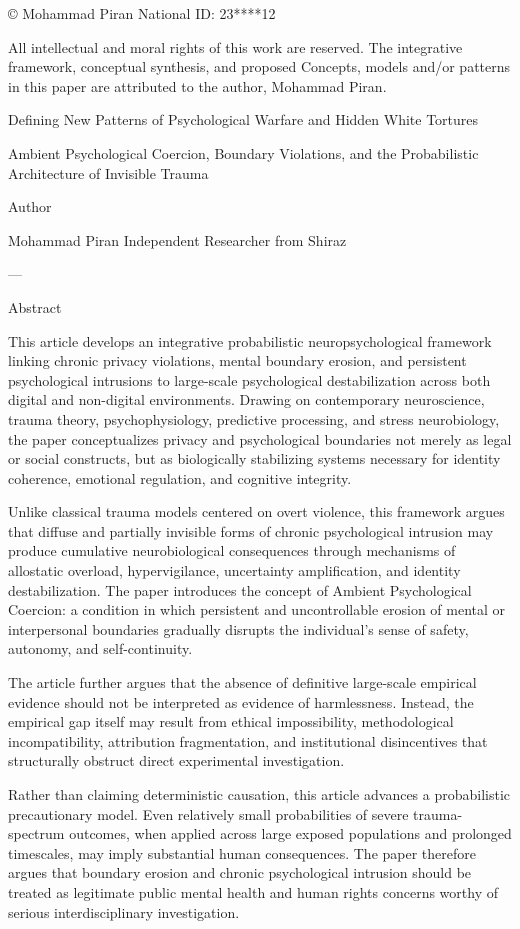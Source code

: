 © Mohammad Piran
National ID: 23****12

All intellectual and moral rights of this work are reserved. The integrative framework, conceptual synthesis, and proposed Concepts, models and/or patterns in this paper are attributed to the author, Mohammad Piran.

Defining New Patterns of Psychological Warfare and Hidden White Tortures

Ambient Psychological Coercion, Boundary Violations, and the Probabilistic Architecture of Invisible Trauma

Author

Mohammad Piran
Independent Researcher from Shiraz


---

Abstract

This article develops an integrative probabilistic neuropsychological framework linking chronic privacy violations, mental boundary erosion, and persistent psychological intrusions to large-scale psychological destabilization across both digital and non-digital environments. Drawing on contemporary neuroscience, trauma theory, psychophysiology, predictive processing, and stress neurobiology, the paper conceptualizes privacy and psychological boundaries not merely as legal or social constructs, but as biologically stabilizing systems necessary for identity coherence, emotional regulation, and cognitive integrity.

Unlike classical trauma models centered on overt violence, this framework argues that diffuse and partially invisible forms of chronic psychological intrusion may produce cumulative neurobiological consequences through mechanisms of allostatic overload, hypervigilance, uncertainty amplification, and identity destabilization. The paper introduces the concept of Ambient Psychological Coercion: a condition in which persistent and uncontrollable erosion of mental or interpersonal boundaries gradually disrupts the individual’s sense of safety, autonomy, and self-continuity.

The article further argues that the absence of definitive large-scale empirical evidence should not be interpreted as evidence of harmlessness. Instead, the empirical gap itself may result from ethical impossibility, methodological incompatibility, attribution fragmentation, and institutional disincentives that structurally obstruct direct experimental investigation.

Rather than claiming deterministic causation, this article advances a probabilistic precautionary model. Even relatively small probabilities of severe trauma-spectrum outcomes, when applied across large exposed populations and prolonged timescales, may imply substantial human consequences. The paper therefore argues that boundary erosion and chronic psychological intrusion should be treated as legitimate public mental health and human rights concerns worthy of serious interdisciplinary investigation.


